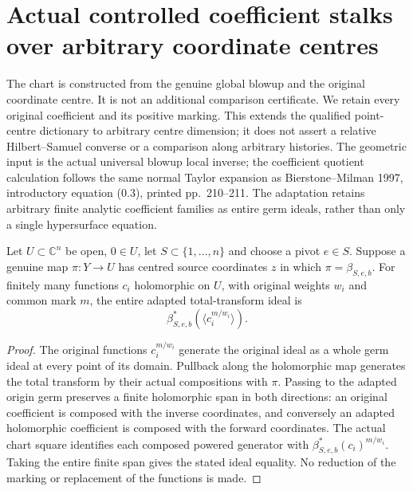 \chapter{Actual controlled coefficient stalks over arbitrary coordinate centres}
\label{chap:actual-centre-weighted-controlled-stalk}

The chart is constructed from the genuine global blowup and the original coordinate centre. It is not an additional comparison certificate. We retain every original coefficient and its positive marking. This extends the qualified point-centre dictionary to arbitrary centre dimension; it does not assert a relative Hilbert--Samuel converse or a comparison along arbitrary histories. The geometric input is the actual universal blowup local inverse; the coefficient quotient calculation follows the same normal Taylor expansion as Bierstone--Milman 1997, introductory equation (0.3), printed pp.~210--211. The adaptation retains arbitrary finite analytic coefficient families as entire germ ideals, rather than only a single hypersurface equation.

\begin{lemma}
\label{hir:actual-centre-weighted-total-stalk}
\leanok
Let $U\subset\mathbb C^n$ be open, $0\in U$, let $S\subset\{1,\ldots,n\}$ and choose a pivot $e\in S$. Suppose a genuine map $\pi:Y\to U$ has centred source coordinates $z$ in which $\pi=\beta_{S,e,b}$. For finitely many functions $c_i$ holomorphic on $U$, with original weights $w_i$ and common mark $m$, the entire adapted total-transform ideal is
\[
 \beta_{S,e,b}^*(\langle c_i^{m/w_i}\rangle).
\]
\end{lemma}
\begin{proof}
The original functions $c_i^{m/w_i}$ generate the original ideal as a whole germ ideal at every point of its domain. Pullback along the holomorphic map generates the total transform by their actual compositions with $\pi$. Passing to the adapted origin germ preserves a finite holomorphic span in both directions: an original coefficient is composed with the inverse coordinates, and conversely an adapted holomorphic coefficient is composed with the forward coordinates. The actual chart square identifies each composed powered generator with $\beta_{S,e,b}^*(c_i)^{m/w_i}$. Taking the entire finite span gives the stated ideal equality. No reduction of the marking or replacement of the functions is made.
\end{proof}

